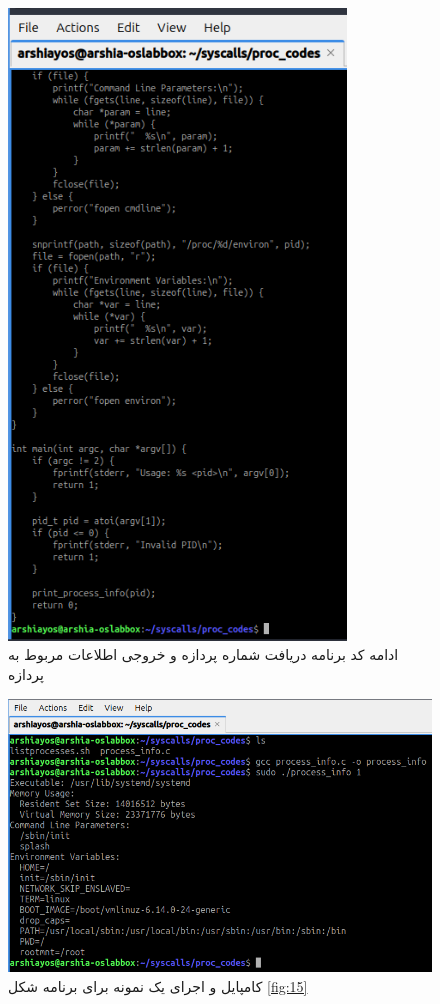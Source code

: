 \documentclass[12pt]{article}
\begin{document}
	\begin{figure}[H]
		\centering
		\includegraphics[width=0.8\textwidth]{report3-resources/17.png}
		\caption{ادامه کد برنامه‌ دریافت شماره پردازه و خروجی اطلاعات مربوط به پردازه}
		\label{fig:16}
	\end{figure}
	\begin{figure}[H]
		\centering
		\includegraphics[width=\textwidth]{report3-resources/18.png}
		\caption{کامپایل و اجرای یک نمونه برای برنامه شکل \ref{fig:15}}
		\label{fig:17}
	\end{figure}
	
\end{document}
